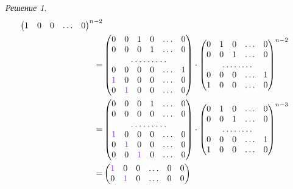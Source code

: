 \documentclass[a4paper,12pt]{article}
\theoremstyle{definition}
\theoremstyle{remark}
\theoremstyle{remark}
\theoremstyle{remark}
\newtheorem*{solution}{Решение}
\begin{document}
\begin{solution}
\begin{equation*}
\begin{split}
\begin{pmatrix}
          1 & 0 & 0 & \ldots & 0
        \end{pmatrix}^{n-2}\\
      = &\begin{pmatrix}
          0 & 0 & 1 & 0 & \ldots & 0\\
          0 & 0 & 0 & 1 & \ldots & 0\\
          \hdotsfor{6}\\
          0 & 0 & 0 & 0 & \ldots & 1\\
          \textcolor{light-purple}{1} & 0 & 0 & 0 & \ldots & 0\\
          0 & \textcolor{light-purple}{1} & 0 & 0 & \ldots & 0
        \end{pmatrix}
        \cdot \begin{pmatrix}
          0 & 1 & 0 & \ldots & 0\\
          0 & 0 & 1 & \ldots & 0\\
          \hdotsfor{5}\\
          0 & 0 & 0 & \ldots & 1\\
          1 & 0 & 0 & \ldots & 0
        \end{pmatrix}^{n-2}\\
      = &\begin{pmatrix}
          0 & 0 & 0 & 1 & \ldots & 0\\
          0 & 0 & 0 & 0 & \ldots & 0\\
          \hdotsfor{6}\\
          \textcolor{light-purple}{1} & 0 & 0 & 0 & \ldots & 0\\
          0 & \textcolor{light-purple}{1} & 0 & 0 & \ldots & 0\\
          0 & 0 & \textcolor{light-purple}{1} & 0 & \ldots & 0
        \end{pmatrix}
        \cdot \begin{pmatrix}
          0 & 1 & 0 & \ldots & 0\\
          0 & 0 & 1 & \ldots & 0\\
          \hdotsfor{5}\\
          0 & 0 & 0 & \ldots & 1\\
          1 & 0 & 0 & \ldots & 0
        \end{pmatrix}^{n-3}\\
      = &\begin{pmatrix}
          \textcolor{light-purple}{1} & 0 & 0 & \ldots & 0 & 0\\
          0 & \textcolor{light-purple}{1} & 0 & \ldots & 0 & 0\\

\end{pmatrix}
\end{split}
\end{equation*}
\end{solution}
\end{document}
